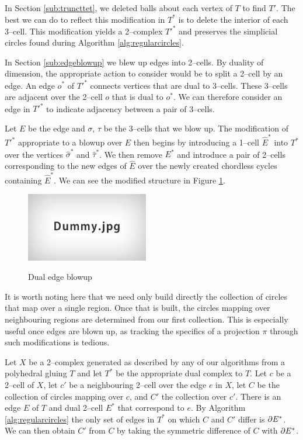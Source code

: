 In Section \ref{sub:truncttet}, we deleted balls about each vertex of $T$ to find $T'$.
The best we can do to reflect this modification in $T^*$ is to delete the interior of each 3--cell.
This modification yields a 2--complex $T'^*$ and preserves the simplicial circles found during Algorithm \ref{alg:regularcircles}.

In Section \ref{sub:edgeblowup} we blew up edges into 2--cells.
By duality of dimension, the appropriate action to consider would be to split a 2--cell by an edge.
An edge $o^*$ of $T'^*$ connects vertices that are dual to 3--cells.
These 3--cells are adjacent over the 2--cell $o$ that is dual to $o^*$.
We can therefore consider an edge in $T'^*$ to indicate adjacency between a pair of 3--cells.

Let $E$ be the edge and $\sigma$, $\tau$ be the 3--cells that we blow up.
The modification of $T'^*$ appropriate to a blowup over $E$ then begins by introducing a 1--cell $\hat{E}^*$ into $T^*$ over the vertices $\hat{\sigma}^*$ and $\hat{\tau}^*$.
We then remove $E^*$ and introduce a pair of 2--cells corresponding to the new edges of $\hat{E}$ over the newly created chordless cycles containing $\hat{E}^*$.
We can see the modified structure in Figure \ref{fig:dualblowup}.

\begin{figure}
	\centering
	\captionsetup{justification=centering}
	\caption{Dual edge blowup}
	\includegraphics[height=3cm]{figures/dummy.jpg}
	\label{fig:dualblowup}
\end{figure}

It is worth noting here that we need only build directly the collection of circles that map over a single region.
Once that is built, the circles mapping over neighbouring regions are determined from our first collection.
This is especially useful once edges are blown up, as tracking the specifics of a projection $\pi$ through such modifications is tedious.

Let $X$ be a 2--complex generated as described by any of our algorithms from a polyhedral gluing $T$ and let $T^*$ be the appropriate dual complex to $T$.
Let $c$ be a 2--cell of $X$, let $c'$ be a neighbouring 2--cell over the edge $e$ in $X$, let $C$ be the collection of circles mapping over $c$, and $C'$ the collection over $c'$.
There is an edge $E$ of $T$ and dual 2--cell $E^*$ that correspond to $e$.
By Algorithm \ref{alg:regularcircles} the only set of edges in $T^*$ on which $C$ and $C'$ differ is $\partial E^*$.
We can then obtain $C'$ from $C$ by taking the symmetric difference of $C$ with $\partial E^*$.